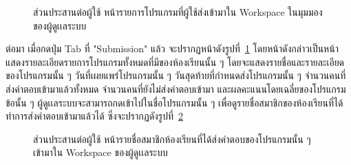 \documentclass[12pt,one side,openright,a4paper]{cpe-thesis-th}
\newcommand{\thaijustify}[1]{%
  \par\hspace{30pt}\justifying
  #1
}
\begin{document}
\pagebreak
\hypertarget{ui-assign7}{
  \begin{figure}[H]
    \centering
    \caption[ส่วนประสานต่อผู้ใช้ หน้ารายการโปรแกรมที่ผู้ใช้ส่งเข้ามาใน Workspace ในมุมมองของผู้ดูเเลระบบ]{ส่วนประสานต่อผู้ใช้ หน้ารายการโปรแกรมที่ผู้ใช้ส่งเข้ามาใน Workspace ในมุมมองของผู้ดูเเลระบบ}
    \label{fig:ui-assign7}
  \end{figure}
}
\thaijustify{
  ต่อมา เมื่อกดปุ่ม Tab ที่ "Submission" แล้ว จะปรากฏหน้าดังรูปที่~\ref{fig:ui-assign7} โดยหน้าดังกล่าวเป็นหน้าแสดงรายละเอียดรายการโปรแกรมทั้งหมดที่มีของห้องเรียนนั้น ๆ โดยจะแสดงรายชื่อและรายละเอียดของโปรแกรมนั้น ๆ วันที่เผยแพร่โปรแกรมนั้น ๆ วันสุดท้ายที่กำหนดส่งโปรแกรมนั้น ๆ จำนวนคนที่ส่งคำตอบเข้ามาแล้วทั้งหมด จำนวนคนที่ยังไม่ส่งคำตอบเข้ามา และผลคะแนนโดยเฉลี่ยของโปรแกรมข้อนั้น ๆ ผู้ดูเเลระบบจะสามารถกดเข้าไปในชื่อโปรแกรมนั้น ๆ เพื่อดูรายชื่อสมาชิกของห้องเรียนที่ได้ทำการส่งคำตอบเข้ามาแล้วได้ ซึ่งจะปรากฏดังรูปที่~\ref{fig:ui-assign8}
}
\hypertarget{ui-assign8}{
  \begin{figure}[H]
    \centering
    \caption[ส่วนประสานต่อผู้ใช้ หน้ารายชื่อสมาชิกห้องเรียนที่ได้ส่งคำตอบของโปรแกรมนั้น ๆ ของผู้ดูเเลระบบ]{ส่วนประสานต่อผู้ใช้ หน้ารายชื่อสมาชิกห้องเรียนที่ได้ส่งคำตอบของโปรแกรมนั้น ๆ เข้ามาใน Workspace ของผู้ดูเเลระบบ}
    \label{fig:ui-assign8}
  \end{figure}
}
\end{document}
